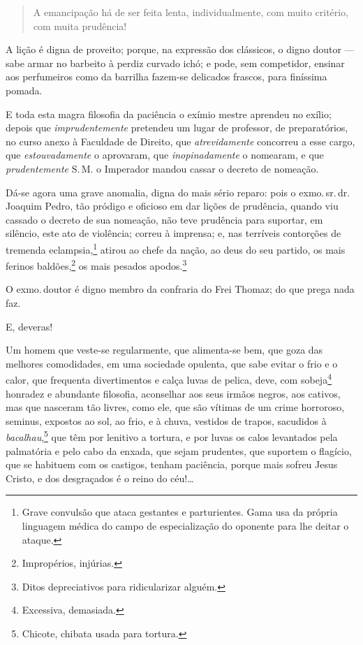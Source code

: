 \begin{quote}
A emancipação há de ser feita lenta, individualmente, com muito
critério, com muita prudência!
\end{quote}

A lição é digna de proveito; porque, na expressão dos clássicos, o digno
doutor --- sabe armar no barbeito à perdiz curvado ichó; e pode, sem
competidor, ensinar aos perfumeiros como da barrilha fazem-se delicados
frascos, para finíssima pomada.

E toda esta magra filosofia da paciência o exímio mestre aprendeu no
exílio; depois que \emph{imprudentemente} pretendeu um lugar de
professor, de preparatórios, no curso anexo à Faculdade de Direito, que
\emph{atrevidamente} concorreu a esse cargo, que \emph{estouvadamente} o
aprovaram, que \emph{inopinadamente} o nomearam, e que
\emph{prudentemente} S.\,M. o Imperador mandou cassar o decreto de
nomeação.

Dá-se agora uma grave anomalia, digna do mais sério reparo: pois o exmo.\,sr.\,dr.\,Joaquim Pedro, tão pródigo e oficioso em dar lições de
prudência, quando viu cassado o decreto de sua nomeação, não teve
prudência para suportar, em silêncio, este ato de violência; correu à
imprensa; e, nas terríveis contorções de tremenda eclampsia,\footnote{
  Grave convulsão que ataca gestantes e parturientes. Gama usa da
  própria linguagem médica do campo de especialização do oponente para
  lhe deitar o ataque.} atirou ao chefe da nação, ao deus do seu
partido, os mais ferinos baldões,\footnote{Impropérios, injúrias.} os
mais pesados apodos.\footnote{Ditos depreciativos para ridicularizar
  alguém.}

O exmo.\,doutor é digno membro da confraria do Frei Thomaz; do que prega
nada faz.

E, deveras!

Um homem que veste-se regularmente, que alimenta-se bem, que goza das
melhores comodidades, em uma sociedade opulenta, que sabe evitar o frio
e o calor, que frequenta divertimentos e calça luvas de pelica, deve,
com sobeja\footnote{Excessiva, demasiada.} honradez e abundante
filosofia, aconselhar aos seus irmãos negros, aos cativos, mas que
nasceram tão livres, como ele, que são vítimas de um crime horroroso,
seminus, expostos ao sol, ao frio, e à chuva, vestidos de trapos,
sacudidos à \emph{bacalhau},\footnote{Chicote, chibata usada para
  tortura.} que têm por lenitivo a tortura, e por luvas os calos
levantados pela palmatória e pelo cabo da enxada, que sejam prudentes,
que suportem o flagício, que se habituem com os castigos, tenham
paciência, porque mais sofreu Jesus Cristo, e dos desgraçados é o reino
do céu!\ldots{}

